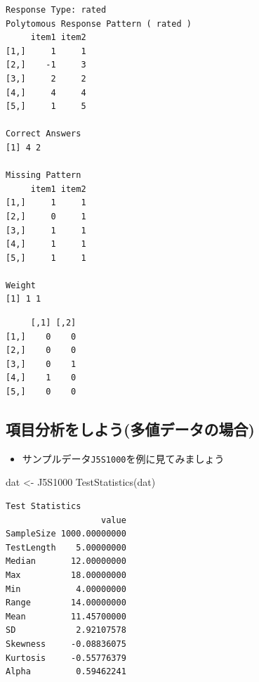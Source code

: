 \documentclass[
  a4paper,
]{ltjsbook}
\newenvironment{Shaded}{\begin{snugshade}}{\end{snugshade}}
\newcommand{\FunctionTok}[1]{\textcolor[rgb]{0.28,0.35,0.67}{#1}}
\newcommand{\NormalTok}[1]{\textcolor[rgb]{0.00,0.23,0.31}{#1}}
\newcommand{\OtherTok}[1]{\textcolor[rgb]{0.00,0.23,0.31}{#1}}
\newcommand{\SpecialCharTok}[1]{\textcolor[rgb]{0.37,0.37,0.37}{#1}}
\providecommand{\tightlist}{%
  \setlength{\itemsep}{0pt}\setlength{\parskip}{0pt}}\usepackage{longtable,booktabs,array}
\begin{document}
\begin{verbatim}
Response Type: rated 
Polytomous Response Pattern ( rated )
     item1 item2
[1,]     1     1
[2,]    -1     3
[3,]     2     2
[4,]     4     4
[5,]     1     5

Correct Answers
[1] 4 2

Missing Pattern
     item1 item2
[1,]     1     1
[2,]     0     1
[3,]     1     1
[4,]     1     1
[5,]     1     1

Weight
[1] 1 1
\end{verbatim}

\begin{Shaded}
\end{Shaded}

\begin{verbatim}
     [,1] [,2]
[1,]    0    0
[2,]    0    0
[3,]    0    1
[4,]    1    0
[5,]    0    0
\end{verbatim}

\subsection{項目分析をしよう(多値データの場合)}\label{ux9805ux76eeux5206ux6790ux3092ux3057ux3088ux3046ux591aux5024ux30c7ux30fcux30bfux306eux5834ux5408}

\begin{itemize}
\tightlist
\item
  サンプルデータ\texttt{J5S1000}を例に見てみましょう
\end{itemize}

\begin{Shaded}
\begin{Highlighting}[]
\NormalTok{dat }\OtherTok{\textless{}{-}}\NormalTok{ J5S1000}
\FunctionTok{TestStatistics}\NormalTok{(dat)}
\end{Highlighting}
\end{Shaded}

\begin{verbatim}
Test Statistics
                   value
SampleSize 1000.00000000
TestLength    5.00000000
Median       12.00000000
Max          18.00000000
Min           4.00000000
Range        14.00000000
Mean         11.45700000
SD            2.92107578
Skewness     -0.08836075
Kurtosis     -0.55776379
Alpha         0.59462241
\end{verbatim}
\end{document}
